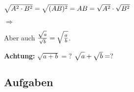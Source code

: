 \begin{center}
$\sqrt{\mathstrut{}A^2\cdot B^2}=\sqrt{(AB)^2}=AB=\sqrt{A^2}\cdot\sqrt{B^2}$
\end{center}

$\Rightarrow$

\begin{center}
\end{center}

Aber auch $\frac{\sqrt{a\mathstrut{}}}{\sqrt{b}}=\sqrt{\frac{a\mathstrut{}}{b}}$.

\textbf{Achtung:}
$\sqrt{a+b} = ?$
$\sqrt{a\mathstrut{}} + \sqrt{b\mathstrut{}} = ?$

\subsection*{Aufgaben}
